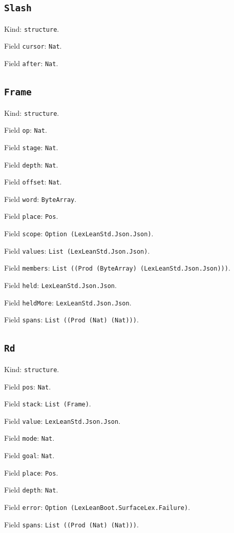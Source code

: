 \documentclass[11pt]{article}
\begin{document}
\subsection*{\texttt{Slash}}
\noindent Kind: \texttt{structure}.\par
\noindent Field \texttt{cursor}: \texttt{Nat}.\par
\noindent Field \texttt{after}: \texttt{Nat}.\par
\subsection*{\texttt{Frame}}
\noindent Kind: \texttt{structure}.\par
\noindent Field \texttt{op}: \texttt{Nat}.\par
\noindent Field \texttt{stage}: \texttt{Nat}.\par
\noindent Field \texttt{depth}: \texttt{Nat}.\par
\noindent Field \texttt{offset}: \texttt{Nat}.\par
\noindent Field \texttt{word}: \texttt{ByteArray}.\par
\noindent Field \texttt{place}: \texttt{Pos}.\par
\noindent Field \texttt{scope}: \texttt{Option (LexLeanStd.Json.Json)}.\par
\noindent Field \texttt{values}: \texttt{List (LexLeanStd.Json.Json)}.\par
\noindent Field \texttt{members}: \texttt{List ((Prod (ByteArray) (LexLeanStd.Json.Json)))}.\par
\noindent Field \texttt{held}: \texttt{LexLeanStd.Json.Json}.\par
\noindent Field \texttt{heldMore}: \texttt{LexLeanStd.Json.Json}.\par
\noindent Field \texttt{spans}: \texttt{List ((Prod (Nat) (Nat)))}.\par
\subsection*{\texttt{Rd}}
\noindent Kind: \texttt{structure}.\par
\noindent Field \texttt{pos}: \texttt{Nat}.\par
\noindent Field \texttt{stack}: \texttt{List (Frame)}.\par
\noindent Field \texttt{value}: \texttt{LexLeanStd.Json.Json}.\par
\noindent Field \texttt{mode}: \texttt{Nat}.\par
\noindent Field \texttt{goal}: \texttt{Nat}.\par
\noindent Field \texttt{place}: \texttt{Pos}.\par
\noindent Field \texttt{depth}: \texttt{Nat}.\par
\noindent Field \texttt{error}: \texttt{Option (LexLeanBoot.SurfaceLex.Failure)}.\par
\noindent Field \texttt{spans}: \texttt{List ((Prod (Nat) (Nat)))}.\par
\end{document}
